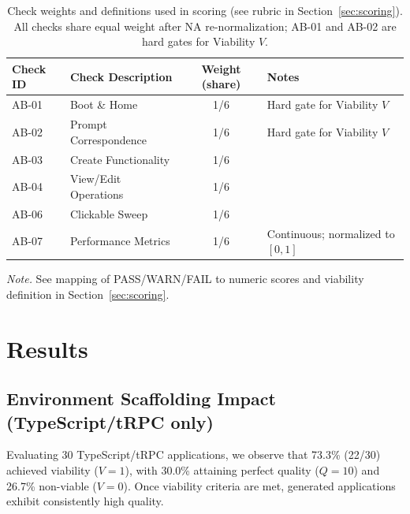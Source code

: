 \documentclass[11pt]{article}
\begin{document}
\begin{table}[t]
\caption{Check weights and definitions used in scoring (see rubric in Section~\ref{sec:scoring}). All checks share equal weight after NA re-normalization; AB-01 and AB-02 are hard gates for Viability $V$.}
\label{tab:check-weights}
\centering
\begin{threeparttable}
\begin{tabular}{llcl}
\toprule
Check ID & Check Description & Weight (share) & Notes \\
\midrule
AB-01 & Boot \& Home & 1/6 & Hard gate for Viability $V$ \\
AB-02 & Prompt Correspondence & 1/6 & Hard gate for Viability $V$ \\
AB-03 & Create Functionality & 1/6 &  \\
AB-04 & View/Edit Operations & 1/6 &  \\
AB-06 & Clickable Sweep & 1/6 &  \\
AB-07 & Performance Metrics & 1/6 & Continuous; normalized to $[0,1]$ \\
\bottomrule
\end{tabular}
\begin{tablenotes}
\item \textit{Note.} See mapping of PASS/WARN/FAIL to numeric scores and viability definition in Section~\ref{sec:scoring}.
\end{tablenotes}
\end{threeparttable}
\end{table}

\section{Results}
\label{sec:results}

\subsection{Environment Scaffolding Impact (TypeScript/tRPC only)}

Evaluating 30 TypeScript/tRPC applications, we observe that 73.3\% (22/30) achieved viability ($V=1$), with 30.0\% attaining perfect quality ($Q=10$) and 26.7\% non-viable ($V=0$). Once viability criteria are met, generated applications exhibit consistently high quality.
\end{document}
